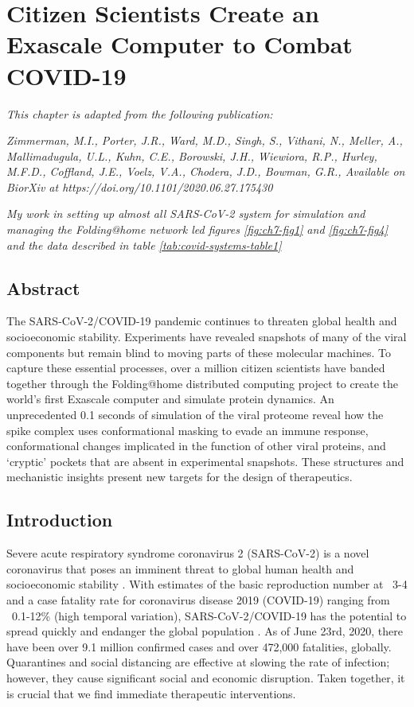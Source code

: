 \documentclass[../main.tex]{subfiles}
\begin{document}
    \chapter{Citizen Scientists Create an Exascale Computer to Combat COVID-19}
    \graphicspath{{Chapter7/}}
    \label{ch:covid19pockets}
    \captionsetup{labelfont=bf}

    \textit{This chapter is adapted from the following publication:}
    
    \textit{Zimmerman, M.I., Porter, J.R., Ward, M.D., Singh, S., Vithani, N., Meller, A., Mallimadugula, U.L., Kuhn, C.E., Borowski, J.H., Wiewiora, R.P., Hurley, M.F.D., Coffland, J.E., Voelz, V.A., Chodera, J.D., Bowman, G.R., Available on BiorXiv at https://doi.org/10.1101/2020.06.27.175430}\cite{Zimmerman2020covid-pocket}

    \textit{My work in setting up almost all SARS-CoV-2 system for simulation and managing the Folding@home network led figures \ref{fig:ch7-fig1} and \ref{fig:ch7-fig4} and the data described in table \ref{tab:covid-systems-table1}}
    
    
    \section{Abstract}
    The SARS-CoV-2/COVID-19 pandemic continues to threaten global health and socioeconomic stability. Experiments have revealed snapshots of many of the viral components but remain blind to moving parts of these molecular machines. To capture these essential processes, over a million citizen scientists have banded together through the Folding@home distributed computing project to create the world’s first Exascale computer and simulate protein dynamics. An unprecedented 0.1 seconds of simulation of the viral proteome reveal how the spike complex uses conformational masking to evade an immune response, conformational changes implicated in the function of other viral proteins, and ‘cryptic’ pockets that are absent in experimental snapshots. These structures and mechanistic insights present new targets for the design of therapeutics.

    \section{Introduction}
    Severe acute respiratory syndrome coronavirus 2 (SARS-CoV-2) is a novel coronavirus that poses an imminent threat to global human health and socioeconomic stability \cite{zhou_pneumonia_2020,liu_reproductive_2020}. With estimates of the basic reproduction number at ~3-4 and a case fatality rate for coronavirus disease 2019 (COVID-19) ranging from ~0.1-12\% (high temporal variation), SARS-CoV-2/COVID-19 has the potential to spread quickly and endanger the global population \cite{sorci_why_2020,liu_reproductive_2020,khafaie_cross-country_2020,mahase_coronavirus:_2020,onder_case-fatality_2020}. As of June 23rd, 2020, there have been over 9.1 million confirmed cases and over 472,000 fatalities, globally. Quarantines and social distancing are effective at slowing the rate of infection; however, they cause significant social and economic disruption. Taken together, it is crucial that we find immediate therapeutic interventions.
\end{document}
